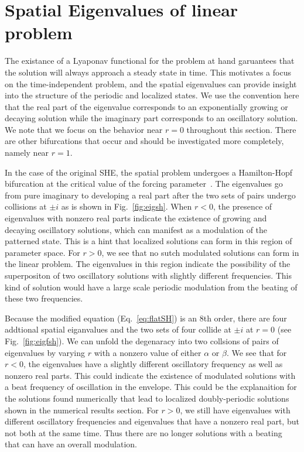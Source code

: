 \documentclass[../main/FlatMarginalStability.tex]{subfiles}
\begin{document}
\section{Spatial Eigenvalues of linear problem}
The existance of a Lyaponav functional for the problem at hand garuantees that the solution will always approach a steady state in time.  This motivates a focus on the time-independent problem, and the spatial eigenvalues can provide insight into the structure of the periodic and localized states.   We use the convention here that the real part of the eigenvalue corresponds to an exponentially growing or decaying solution while the imaginary part corresponds to an oscillatory solution.  We note that we focus on the behavior near $r=0$ throughout this section.  There are other bifurcations that occur and should be investigated more completely, namely near $r=1$.

In the case of the original SHE, the spatial problem undergoes a Hamilton-Hopf bifurcation at the critical value of the forcing parameter~\cite{}.  The eigenvalues go from pure imaginary to developing a real part after the two sets of pairs undergo collisions at $\pm i$ as is shown in Fig.~\ref{fig:eigsh}.
\FIGeigsh
When $r < 0$, the presence of eigenvalues with nonzero real parts indicate the existence of growing and decaying oscillatory solutions, which can manifest as a modulation of the patterned state.  This is a hint that localized solutions can form in this region of parameter space.  For $r >0$, we see that no sutch modulated solutions can form in the linear problem.  The eigenvalues in this region indicate the possibility of the superpositon of two oscillatory solutions with slightly different frequencies.  This kind of solution would have  a large scale periodic modulation from the beating of these two frequencies.

Because the modified equation (Eq.~\ref{eq:flatSH}) is an 8th order, there are four addtional spatial eiganvalues and the two sets of four collide at $\pm i$ at $r=0$ (see Fig.~\ref{fig:eigfsh}).  We can unfold the degenaracy into two collsions of pairs of eigenvalues by varying $r$ with a nonzero value of either $\alpha$ or $\beta$.  
\FIGeigfsh
We see that for $r<0$, the eigenvalues have a slightly different oscillatory frequency as well as nonzero real parts.  This could indicate the existence of modulated solutions with a beat frequency of oscillation in the envelope.   This could be the explanaition for the solutions found numerically that lead to localized doubly-periodic solutions shown in the numerical results section.  For $r>0$, we still have eigenvalues with different oscillatory frequencies and eigenvalues that have a nonzero real part, but not both at the same time.  Thus there are no longer solutions with a beating that can have an overall modulation. 
\end{document}
